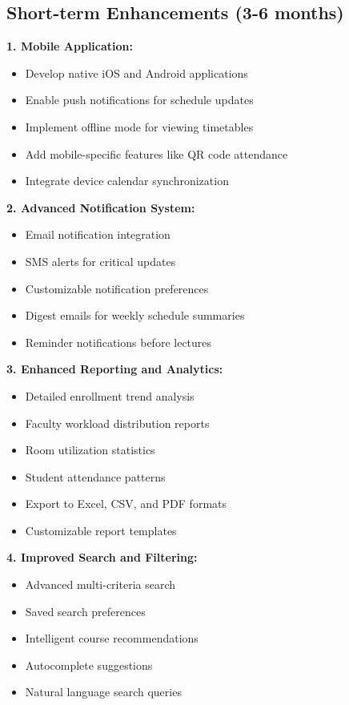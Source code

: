 \subsection{Short-term Enhancements (3-6 months)}

\textbf{1. Mobile Application:}
\begin{itemize}
    \item Develop native iOS and Android applications
    \item Enable push notifications for schedule updates
    \item Implement offline mode for viewing timetables
    \item Add mobile-specific features like QR code attendance
    \item Integrate device calendar synchronization
\end{itemize}

\textbf{2. Advanced Notification System:}
\begin{itemize}
    \item Email notification integration
    \item SMS alerts for critical updates
    \item Customizable notification preferences
    \item Digest emails for weekly schedule summaries
    \item Reminder notifications before lectures
\end{itemize}

\textbf{3. Enhanced Reporting and Analytics:}
\begin{itemize}
    \item Detailed enrollment trend analysis
    \item Faculty workload distribution reports
    \item Room utilization statistics
    \item Student attendance patterns
    \item Export to Excel, CSV, and PDF formats
    \item Customizable report templates
\end{itemize}

\textbf{4. Improved Search and Filtering:}
\begin{itemize}
    \item Advanced multi-criteria search
    \item Saved search preferences
    \item Intelligent course recommendations
    \item Autocomplete suggestions
    \item Natural language search queries
\end{itemize}


